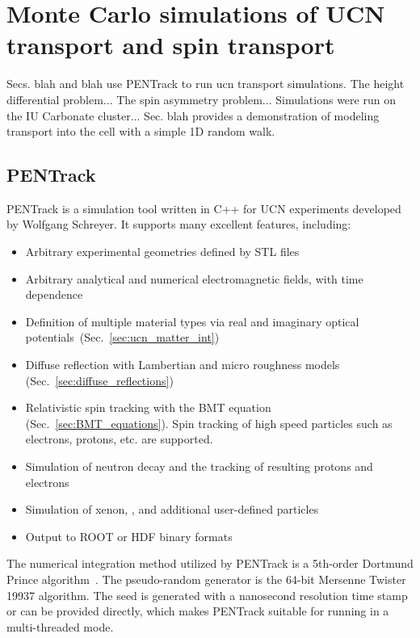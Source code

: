 
\chapter{Monte Carlo simulations of UCN transport and spin transport}\label{chap:simulations}


Secs. blah and blah use PENTrack to run ucn transport simulations. The height differential problem... The spin asymmetry problem... Simulations were run on the IU Carbonate cluster... Sec. blah provides a demonstration of modeling transport into the cell with a simple 1D random walk. 


\section{PENTrack}


PENTrack \cite{schreyer_pentrack} is a simulation tool written in C++ for UCN experiments developed by Wolfgang Schreyer. It supports many excellent features, including:
%
\begin{itemize}
    \item Arbitrary experimental geometries defined by STL files
    \item Arbitrary analytical and numerical electromagnetic fields, with time dependence
    \item Definition of multiple material types via real and imaginary optical potentials~(Sec.~\ref{sec:ucn_matter_int})
    \item Diffuse reflection with Lambertian and micro roughness models (Sec.~\ref{sec:diffuse_reflections})
    \item Relativistic spin tracking with the BMT equation (Sec.~\ref{sec:BMT_equations}). Spin tracking of high speed particles such as electrons, protons, etc. are supported.
    \item Simulation of neutron decay and the tracking of resulting protons and electrons
    \item Simulation of xenon, \hg, and additional user-defined particles
    \item Output to ROOT or HDF binary formats
\end{itemize}
%
The numerical integration method utilized by PENTrack is a 5th-order Dortmund Prince algorithm~\cite{numerical_recipes}. The pseudo-random generator is the 64-bit Mersenne Twister 19937 algorithm. The seed is generated with a nanosecond resolution time stamp or can be provided directly, which makes PENTrack suitable for running in a multi-threaded mode.

